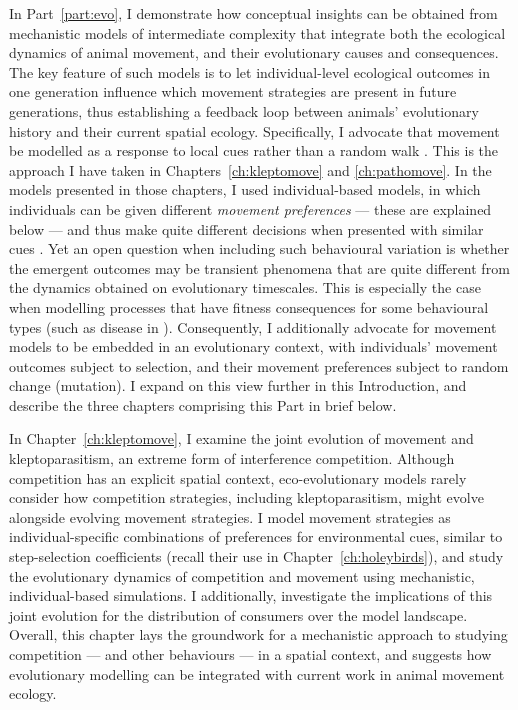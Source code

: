 In Part~\ref{part:evo}, I demonstrate how conceptual insights can be obtained from mechanistic models of intermediate complexity that integrate both the ecological dynamics of animal movement, and their evolutionary causes and consequences.
The key feature of such models is to let individual-level ecological outcomes in one generation influence which movement strategies are present in future generations, thus establishing a feedback loop between animals' evolutionary history and their current spatial ecology.
Specifically, I advocate that movement be modelled as a response to local cues rather than a random walk \citep[`mechanistic'; see][]{mueller2011}.
This is the approach I have taken in Chapters~\ref{ch:kleptomove} and \ref{ch:pathomove}.
In the models presented in those chapters, I used individual-based models, in which individuals can be given different \emph{movement preferences} --- these are explained below --- and thus make quite different decisions when presented with similar cues \citep{getz2015,white2018}.
Yet an open question when including such behavioural variation is whether the emergent outcomes may be transient phenomena that are quite different from the dynamics obtained on evolutionary timescales.
This is especially the case when modelling processes that have fitness consequences for some behavioural types (such as disease in \cite[]{white2018}).
Consequently, I additionally advocate for movement models to be embedded in an evolutionary context, with individuals' movement outcomes subject to selection, and their movement preferences subject to random change (mutation).
I expand on this view further in this Introduction, and describe the three chapters comprising this Part in brief below.

In Chapter~\ref{ch:kleptomove}, I examine the joint evolution of movement and kleptoparasitism, an extreme form of interference competition.
Although competition has an explicit spatial context, eco-evolutionary models rarely consider how competition strategies, including kleptoparasitism, might evolve alongside evolving movement strategies.
I model movement strategies as individual-specific combinations of preferences for environmental cues, similar to step-selection coefficients (recall their use in Chapter~\ref{ch:holeybirds}), and study the evolutionary dynamics of competition and movement using mechanistic, individual-based simulations.
I additionally, investigate the implications of this joint evolution for the distribution of consumers over the model landscape.
Overall, this chapter lays the groundwork for a mechanistic approach to studying competition --- and other behaviours --- in a spatial context, and suggests how evolutionary modelling can be integrated with current work in animal movement ecology.

